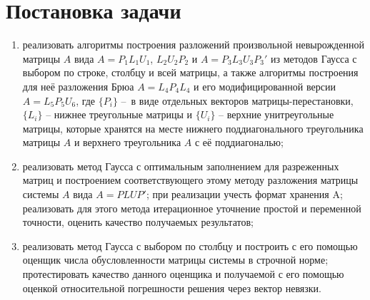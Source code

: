 \section{Постановка задачи}
\begin{enumerate}
	\item реализовать алгоритмы построения разложений произвольной невырожденной матрицы $A$ вида $A=P_1 L_1 U_1$, $L_2 U_2 P_2$ и $A=P_3 L_3 U_3 P_3'$ из методов Гаусса с выбором по строке, столбцу и всей матрицы, а также алгоритмы построения для неё разложения Брюа $A=L_4 P_4 L_4$ и его модифицированной версии $A=L_5 P_5 U_6$, где $\{P_i\}$ – в виде отдельных векторов матрицы-перестановки, $\{L_i\}$ – нижнее треугольные матрицы и $\{U_i\}$ – верхние унитреугольные матрицы, которые хранятся на месте нижнего поддиагонального треугольника матрицы $A$ и верхнего треугольника $A$ с её поддиагональю;
	\item реализовать метод Гаусса с оптимальным заполнением для разреженных матриц и построением соответствующего этому методу разложения матрицы системы $A$ вида $A=PLUP'$; при реализации учесть формат хранения A; реализовать для этого метода итерационное уточнение простой и переменной точности, оценить качество получаемых результатов;
	\item реализовать метод Гаусса с выбором по столбцу и построить с его помощью оценщик числа обусловленности матрицы системы в строчной норме; протестировать качество данного оценщика и получаемой с его помощью оценкой относительной погрешности решения через вектор невязки.
\end{enumerate}